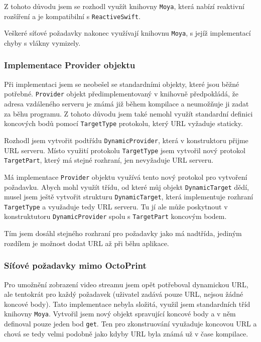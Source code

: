 Z tohoto důvodu jsem se rozhodl využít knihovny \texttt{Moya}, která nabízí reaktivní rozšíření a je kompatibilní s \texttt{ReactiveSwift}.

Veškeré síťové požadavky nakonec využívají knihovnu \texttt{Moya}, s jejíž implementací chyby s vlákny vymizely.

\subsubsection*{Implementace Provider objektu}

Při implementaci jsem se neobešel se standardními objekty, které jsou běžné potřebné.
\texttt{Provider} objekt předimplementovaný v knihovně předpokládá, že adresa vzdáleného serveru je známá již během kompilace a neumožňuje ji zadat za běhu programu.
Z tohoto důvodu jsem také nemohl využít standardní definici koncových bodů pomocí \texttt{TargetType} protokolu, který URL vyžaduje staticky.

Rozhodl jsem vytvořit podtřídu \texttt{DynamicProvider}, která v konstruktoru přijme URL serveru.
Místo využití protokolu \texttt{TargetType} jsem vytvořil nový protokol \texttt{TargetPart}, který má stejné rozhraní, jen nevyžaduje URL serveru.

Má implementace \texttt{Provider} objektu využívá tento nový protokol pro vytvoření požadavku.
Abych mohl využít třídu, od které můj objekt \texttt{DynamicTarget} dědí, musel jsem ještě vytvořit strukturu \texttt{DynamicTarget}, která implementuje rozhraní \texttt{TargetType} a využaduje tedy URL serveru.
Tu jí ale může poskytnout v konstruktutoru \texttt{DynamicProvider} spolu s \texttt{TargetPart} koncovým bodem.

Tím jsem dosáhl stejného rozhraní pro požadavky jako má nadtřída, jediným rozdílem je možnost dodat URL až při běhu aplikace.

\subsubsection*{Síťové požadavky mimo OctoPrint}

Pro umožnění zobrazení video streamu jsem opět potřeboval dynamickou URL, ale tentokrát pro každý požadavek (uživatel zadává pouze URL, nejsou žádné koncové body).
Tato implementace nebyla složitá, využil jsem standardních tříd knihovny \texttt{Moya}.
Vytvořil jsem nový objekt spravující koncové body a v něm definoval pouze jeden bod \texttt{get}.
Ten pro zkonstruování využaduje koncovou URL a chová se tedy velmi podobně jako kdyby URL byla známá už v čase kompilace.

